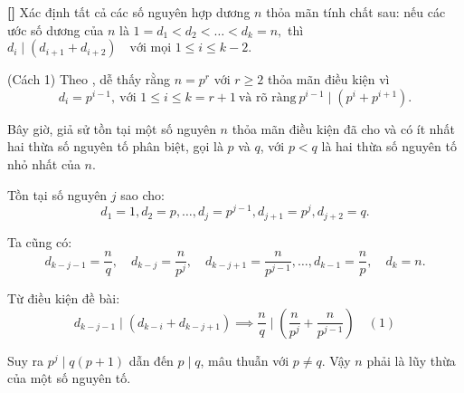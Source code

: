 \documentclass[../01-divisibility.tex]{subfiles}
\begin{document}
\begin{example*}\label{example:IMO-2023-P1}\textbf{[]}
    Xác định tất cả các số nguyên hợp dương \( n \) thỏa mãn tính chất sau: nếu các ước số dương của \( n \) là $1 = d_1 < d_2 < \dots < d_k = n,$
    thì $d_i \mid (d_{i+1} + d_{i+2}) \quad \text{với mọi } 1 \leq i \leq k - 2.$
\end{example*}

\begin{soln}(Cách 1)\footnotemark
    Theo , dễ thấy rằng \( n = p^r \) với \( r \geq 2 \) thỏa mãn điều kiện vì 
    \[
        d_i = p^{i-1},\ \text{với } 1 \leq i \leq k = r+1\ \text{và rõ ràng}\ p^{i-1} \mid (p^i + p^{i+1}).
    \]
    
    Bây giờ, giả sử tồn tại một số nguyên \( n \) thỏa mãn điều kiện đã cho và có ít nhất hai thừa số nguyên tố phân biệt,
    gọi là \( p \) và \( q \), với \( p < q \) là hai thừa số nguyên tố nhỏ nhất của \( n \).
    
    Tồn tại số nguyên \( j \) sao cho:
    \[
        d_1 = 1, d_2 = p, \dots, d_j = p^{j-1}, d_{j+1} = p^j, d_{j+2} = q.
    \]
    
    Ta cũng có:
    \[
        d_{k-j-1} = \frac{n}{q}, \quad d_{k-j} = \frac{n}{p^j}, \quad d_{k-j+1} = \frac{n}{p^{j-1}}, \dots, d_{k-1} = \frac{n}{p}, \quad d_k = n.
    \]
    
    Từ điều kiện đề bài:
    \[
        d_{k-j-1} \mid (d_{k-i} + d_{k-j+1}) \implies \frac{n}{q} \mid \left( \frac{n}{p^j} + \frac{n}{p^{j-1}} \right)  \quad (1)
    \]
    
    Suy ra $p^j \mid q(p+1)$ dẫn đến $p \mid q$, mâu thuẫn với $p \neq q$. Vậy \( n \) phải là lũy thừa của một số nguyên tố.
\end{soln}

\bigbreak
\end{document}
